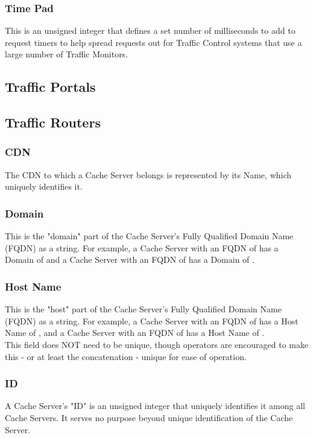 \subsubsection{Time Pad}
This is an unsigned integer that defines a set number of milliseconds to add
to request timers to help spread requests out for Traffic Control systems that
use a large number of Traffic Monitors.

\subsection{Traffic Portals}



\subsection{Traffic Routers}

\subsubsection{CDN}
The CDN to which a Cache Server belongs is represented by its Name, which
uniquely identifies it.

\subsubsection{Domain}
This is the "domain" part of the Cache Server's Fully Qualified Domain Name
(FQDN) as a string. For example, a Cache Server with an FQDN of
 has a Domain of  and a Cache Server with an FQDN of
 has a Domain of .

\subsubsection{Host Name}
This is the "host" part of the Cache Server's Fully Qualified Domain Name (FQDN)
as a string. For example, a Cache Server with an FQDN of  has a
Host Name of , and a Cache Server with an FQDN of
 has a Host Name of .\\
This field does NOT need to be unique, though operators are encouraged to make
this - or at least the concatenation  - unique
for ease of operation.

\subsubsection{ID}
A Cache Server's "ID" is an unsigned integer that uniquely identifies it among
all Cache Servers. It serves no purpose beyond unique identification of the
Cache Server.

